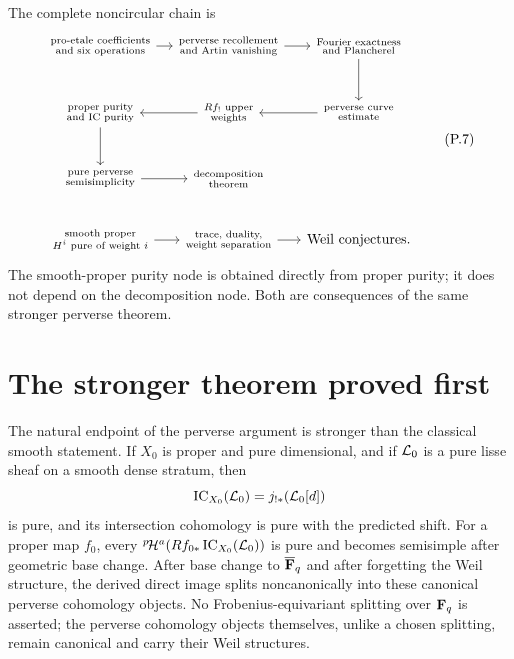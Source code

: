 The complete noncircular chain is
\[
\begin{tikzcd}[column sep=small,row sep=large]
\substack{\text{pro-etale coefficients}\\
          \text{and six operations}}
 \arrow[r] &
\substack{\text{perverse recollement}\\
          \text{and Artin vanishing}}
 \arrow[r] &
\substack{\text{Fourier exactness}\\
          \text{and Plancherel}}
 \arrow[d] \\
\substack{\text{proper purity}\\
          \text{and IC purity}}
 \arrow[d] &
\substack{Rf_!\text{ upper}\\
          \text{weights}}
 \arrow[l] &
\substack{\text{perverse curve}\\
          \text{estimate}}
 \arrow[l] \\
\substack{\text{pure perverse}\\
          \text{semisimplicity}}
 \arrow[r] &
\substack{\text{decomposition}\\
          \text{theorem}}
 &
\\[-0.4em]
\substack{\text{smooth proper}\\
          H^i\text{ pure of weight }i}
 \arrow[r] &
\substack{\text{trace, duality,}\\
          \text{weight separation}}
 \arrow[r] &
\text{Weil conjectures.}
\end{tikzcd}
\tag{P.7}\label{eq:preface-dependency-chain}
\]
The smooth-proper purity node is obtained directly from proper purity; it
does not depend on the decomposition node.  Both are consequences of the
same stronger perverse theorem.

\section*{The stronger theorem proved first}

The natural endpoint of the perverse argument is stronger than the classical
smooth statement.  If \(X_0\) is proper and pure dimensional, and if
\(\mathcal L_0\) is a pure lisse sheaf on a smooth dense stratum, then
\[
  \operatorname{IC}_{X_0}(\mathcal L_0)=j_{!*}(\mathcal L_0[d])
\]
is pure, and its intersection cohomology is pure with the predicted shift.
For a proper map \(f_0\), every
\({}^{p}\!\mathcal H^a(Rf_{0*}\operatorname{IC}_{X_0}(\mathcal L_0))\) is pure and becomes semisimple after
geometric base change.  After base change to \(\overline{\mathbf F}_q\) and after forgetting
the Weil structure, the derived direct image splits noncanonically into these
canonical perverse cohomology objects.  No Frobenius-equivariant splitting
over \(\mathbf F_q\) is asserted; the perverse cohomology objects themselves, unlike
a chosen splitting, remain canonical and carry their Weil structures.

